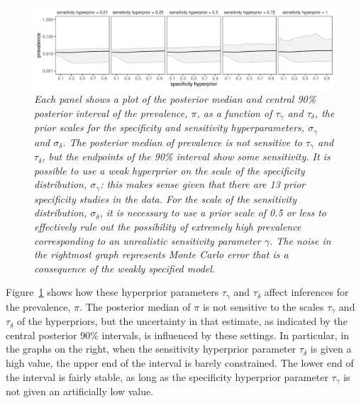 \documentclass[11pt]{article}
\begin{document}
\begin{figure}
  \centerline{\includegraphics[width=\textwidth]{prior-sensitivity-2.pdf}}
  \vspace{-.15in}
\caption{\em Each panel shows a plot of the posterior median and central 90\%
  posterior interval of the prevalence, $\pi$, as a function of $\tau_{\gamma}$ and $\tau_{\delta}$, the prior scales for the specificity  and sensitivity
  hyperparameters, $\sigma_{\gamma}$ and $\sigma_{\delta}$.
  The posterior median of prevalence is not sensitive to $\tau_{\gamma}$ and $\tau_{\delta}$, but the endpoints of the 90\% interval show some sensitivity.  It is possible to use a weak hyperprior on the scale of the specificity distribution,  $\sigma_{\gamma}$:  this makes sense given that there are 13 prior specificity studies in the data.  For the scale of the sensitivity distribution,  $\sigma_{\delta}$, it is necessary to use a prior scale of 0.5 or less to effectively rule out the possibility of extremely high prevalence  corresponding to an unrealistic sensitivity parameter $\gamma$.  The noise in the rightmost graph represents Monte Carlo error that is a consequence of the weakly specified model.}\label{prior-sensitivity.fig}
\end{figure}

Figure~\ref{prior-sensitivity.fig} shows how these hyperprior parameters $\tau_{\gamma}$ and $\tau_{\delta}$ affect inferences for the prevalence, $\pi$.
The posterior median of $\pi$ is not sensitive to the scales
 $\tau_{\gamma}$ and $\tau_{\delta}$ of the hyperpriors, but the
uncertainty in that estimate, as indicated by the central posterior 90\%
intervals, is influenced by these settings.  In particular, in the graphs on the right, when the sensitivity hyperprior parameter $\tau_{\delta}$ is given a high value, the upper end of the interval is barely constrained.  The lower end of the interval is fairly stable, as long as the specificity hyperprior parameter $\tau_{\gamma}$ is not given an artificially low value.
\end{document}
